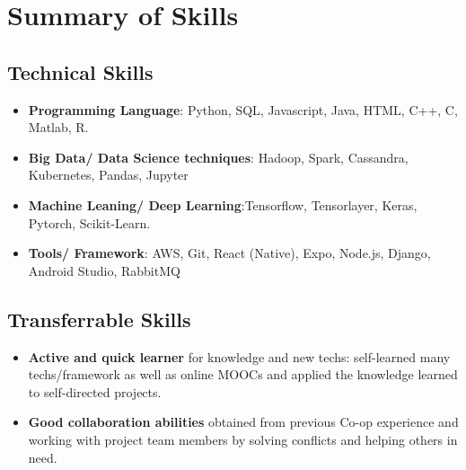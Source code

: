 \documentclass[12pt,a4paper,sans]{moderncv}        %
\begin{document}
\makecvtitle
\section{Summary of Skills}

\vspace{3pt}

\subsection{Technical Skills}

\vspace{3pt}

\begin{itemize}

\item{\textbf{Programming Language}: Python, SQL, Javascript, Java, HTML, C++, C, Matlab, R.}
\vspace{2pt}
\item{\textbf{Big Data/ Data Science techniques}: Hadoop, Spark, Cassandra, Kubernetes, Pandas, Jupyter}
\vspace{2pt}
\item{\textbf{Machine Leaning/ Deep Learning}:Tensorflow, Tensorlayer, Keras, Pytorch, Scikit-Learn.}
\vspace{2pt}
\item{\textbf{Tools/ Framework}: AWS, Git, React (Native), Expo, Node.js, Django, Android Studio, RabbitMQ}
\end{itemize}

\vspace{8pt}

\subsection{Transferrable Skills}

\vspace{3pt}

\begin{itemize}

\item{\textbf{Active and quick learner }{for knowledge and new techs: self-learned many techs/framework as well as online MOOCs and applied the knowledge learned to self-directed projects.}}
\vspace{3pt}

\item{\textbf{Good collaboration abilities }{obtained from previous Co-op experience and working with project team members by solving conflicts and helping others in need.}}


\end{itemize}
\end{document}
